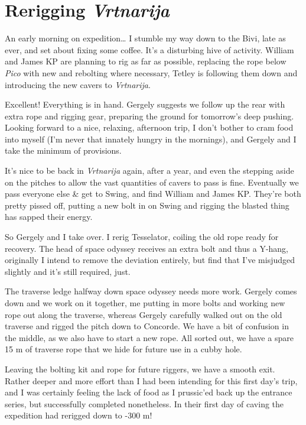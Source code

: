 
\section{\texorpdfstring{Rerigging
\emph{Vrtnarija}}{Rerigging Vrtnarija}}

An early morning on expedition\ldots{} I stumble my way down to the
Bivi, late as ever, and set about fixing some coffee. It's a disturbing
hive of activity. William and James KP are planning to rig as far as
possible, replacing the rope below \emph{Pico} with new and rebolting
where necessary, Tetley is following them down and introducing the new
cavers to \emph{Vrtnarija}.

Excellent! Everything is in hand. Gergely suggests we follow up the rear
with extra rope and rigging gear, preparing the ground for tomorrow's
deep pushing. Looking forward to a nice, relaxing, afternoon trip, I
don't bother to cram food into myself (I'm never that innately hungry in
the mornings), and Gergely and I take the minimum of provisions.

It's nice to be back in \emph{Vrtnarija} again, after a year, and even
the stepping aside on the pitches to allow the vast quantities of cavers
to pass is fine. Eventually we pass everyone else \& get to Swing, and
find William and James KP. They're both pretty pissed off, putting a new
bolt in on Swing and rigging the blasted thing has sapped their energy.

So Gergely and I take over. I rerig Tesselator, coiling the old rope
ready for recovery. The head of space odyssey receives an extra bolt and
thus a Y-hang, originally I intend to remove the deviation entirely, but
find that I've misjudged slightly and it's still required, just.

The traverse ledge halfway down space odyssey needs more work. Gergely
comes down and we work on it together, me putting in more bolts and
working new rope out along the traverse, whereas Gergely carefully
walked out on the old traverse and rigged the pitch down to Concorde. We
have a bit of confusion in the middle, as we also have to start a new
rope. All sorted out, we have a spare 15 m of traverse rope that we hide
for future use in a cubby hole.

Leaving the bolting kit and rope for future riggers, we have a smooth
exit. Rather deeper and more effort than I had been intending for this
first day's trip, and I was certainly feeling the lack of food as I
prussic'ed back up the entrance series, but successfully completed
nonetheless. In their first day of caving the expedition had rerigged
down to -300 m!

